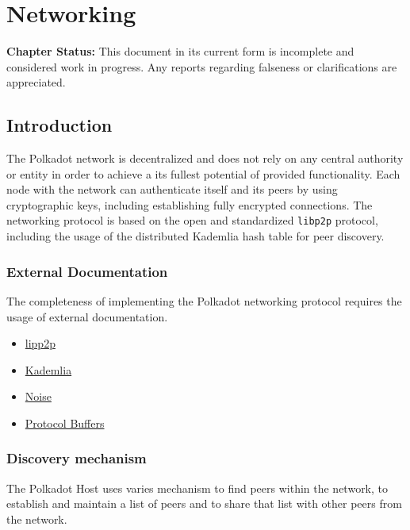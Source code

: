 \chapter{Networking}

\textbf{Chapter Status:} This document in its current form is incomplete and
considered work in progress. Any reports regarding falseness or clarifications
are appreciated.

\section{Introduction}

The Polkadot network is decentralized and does not rely on any central authority
or entity in order to achieve a its fullest potential of provided functionality.
Each node with the network can authenticate itself and its peers by using
cryptographic keys, including establishing fully encrypted connections. The
networking protocol is based on the open and standardized \verb|libp2p|
protocol, including the usage of the distributed Kademlia hash table for peer
discovery.

\subsection{External Documentation}

The completeness of implementing the Polkadot networking protocol requires the
usage of external documentation.

\begin{itemize}
    \item 
    \href{https://github.com/libp2p/specs}{lipp2p}
    \item 
    \href{https://en.wikipedia.org/wiki/Kademlia}{Kademlia}
    \item \href{https://noiseprotocol.org/}{Noise}
    \item
    \href{https://developers.google.com/protocol-buffers/docs/reference/proto3-spec}{Protocol
    Buffers}
\end{itemize}

\subsection{Discovery mechanism}

The Polkadot Host uses varies mechanism to find peers within the network, to
establish and maintain a list of peers and to share that list with other peers
from the network.
\newline


